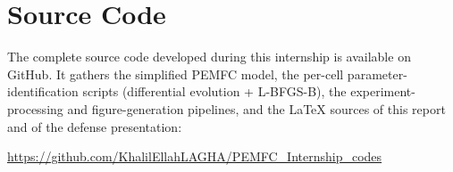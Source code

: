 
\chapter{Source Code}

\label{app:source}

The complete source code developed during this internship is available on GitHub.
It gathers the simplified PEMFC model, the per-cell parameter-identification
scripts (differential evolution + L-BFGS-B), the experiment-processing and
figure-generation pipelines, and the \LaTeX{} sources of this report and of the
defense presentation:

\begin{center}
    \large
    \url{https://github.com/KhalilEllahLAGHA/PEMFC_Internship_codes}
\end{center}
